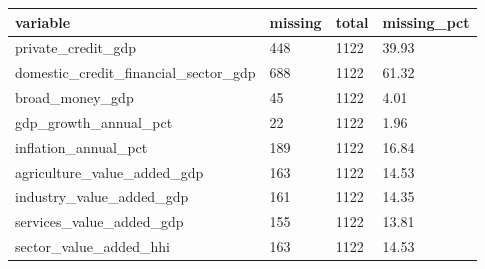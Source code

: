 ﻿%
\begin{tabular}{llll}
\hline
variable & missing & total & missing_pct \\
\hline
private\_credit\_gdp & 448 & 1122 & 39.93 \\
domestic\_credit\_financial\_sector\_gdp & 688 & 1122 & 61.32 \\
broad\_money\_gdp & 45 & 1122 & 4.01 \\
gdp\_growth\_annual\_pct & 22 & 1122 & 1.96 \\
inflation\_annual\_pct & 189 & 1122 & 16.84 \\
agriculture\_value\_added\_gdp & 163 & 1122 & 14.53 \\
industry\_value\_added\_gdp & 161 & 1122 & 14.35 \\
services\_value\_added\_gdp & 155 & 1122 & 13.81 \\
sector\_value\_added\_hhi & 163 & 1122 & 14.53 \\
\hline
\end{tabular}

